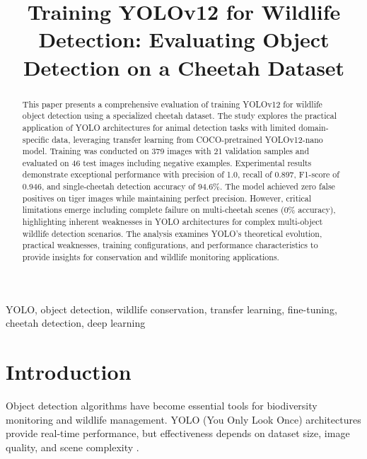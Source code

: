 \documentclass[conference]{IEEEtran}
\begin{document}
\onehalfspacing

\title{Training YOLOv12 for Wildlife Detection: Evaluating Object Detection on a Cheetah Dataset}

\author{
}

\maketitle

\begin{abstract}
This paper presents a comprehensive evaluation of training YOLOv12 for wildlife object detection using a specialized cheetah dataset. The study explores the practical application of YOLO architectures for animal detection tasks with limited domain-specific data, leveraging transfer learning from COCO-pretrained YOLOv12-nano model. Training was conducted on 379 images with 21 validation samples and evaluated on 46 test images including negative examples. Experimental results demonstrate exceptional performance with precision of 1.0, recall of 0.897, F1-score of 0.946, and single-cheetah detection accuracy of 94.6\%. The model achieved zero false positives on tiger images while maintaining perfect precision. However, critical limitations emerge including complete failure on multi-cheetah scenes (0\% accuracy), highlighting inherent weaknesses in YOLO architectures for complex multi-object wildlife detection scenarios. The analysis examines YOLO's theoretical evolution, practical weaknesses, training configurations, and performance characteristics to provide insights for conservation and wildlife monitoring applications.
\end{abstract}

\begin{IEEEkeywords}
YOLO, object detection, wildlife conservation, transfer learning, fine-tuning, cheetah detection, deep learning
\end{IEEEkeywords}

\section{Introduction}

Object detection algorithms have become essential tools for biodiversity monitoring and wildlife management. YOLO (You Only Look Once) architectures provide real-time performance, but effectiveness depends on dataset size, image quality, and scene complexity \cite{b3}.
\end{document}

